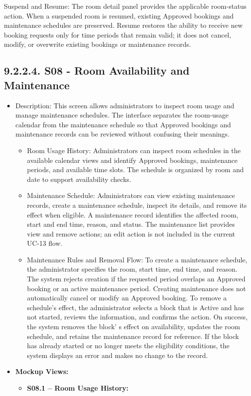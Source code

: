 Suspend and Resume: The room detail panel provides the applicable
room-status action. When a suspended room is resumed, existing Approved
bookings and maintenance schedules are preserved. Resume restores the
ability to receive new booking requests only for time periods that
remain valid; it does not cancel, modify, or overwrite existing bookings
or maintenance records.

\subsection*{9.2.2.4. S08 - Room Availability and
Maintenance}\label{s08---room-availability-and-maintenance}

\begin{itemize}
\item
  Description: This screen allows administrators to inspect room usage
  and manage maintenance schedules. The interface separates the
  room-usage calendar from the maintenance schedule so that Approved
  bookings and maintenance records can be reviewed without confusing
  their meanings.

  \begin{itemize}
  \item
    Room Usage History: Administrators can inspect room schedules in the
    available calendar views and identify Approved bookings, maintenance
    periods, and available time slots. The schedule is organized by room
    and date to support availability checks.
  \item
    Maintenance Schedule: Administrators can view existing maintenance
    records, create a maintenance schedule, inspect its details, and
    remove its effect when eligible. A maintenance record identifies the
    affected room, start and end time, reason, and status. The
    maintenance list provides view and remove actions; an edit action is
    not included in the current UC-13 flow.
  \item
    Maintenance Rules and Removal Flow: To create a maintenance
    schedule, the administrator specifies the room, start time, end
    time, and reason. The system rejects creation if the requested
    period overlaps an Approved booking or an active maintenance period.
    Creating maintenance does not automatically cancel or modify an
    Approved booking. To remove a schedule's effect, the
    administrator selects a block that is Active and has not started,
    reviews the information, and confirms the action. On success, the
    system removes the block' s effect on availability,
    updates the room schedule, and retains the maintenance record for
    reference. If the block has already started or no longer meets the
    eligibility conditions, the system displays an error and makes no
    change to the record.
  \end{itemize}
\item
  \textbf{Mockup Views:}

  \begin{itemize}
  \item
    \textbf{S08.1 -- Room Usage History:}
  \end{itemize}
\end{itemize}

